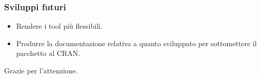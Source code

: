 \documentclass{beamer}
\begin{document}
\begin{frame}
\frametitle{Sviluppi futuri}
\begin{itemize}
\item Rendere i tool più flessibili.
\item Produrre la documentazione relativa a quanto sviluppato per sottomettere il pacchetto al CRAN.
\end{itemize}
\end{frame}

\begin{frame}[plain]
\begin{center}
\begin{huge}
Grazie per l'attenzione.
\end{huge}
\end{center}
\end{frame}
\end{document}
